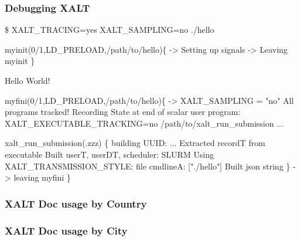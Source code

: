\documentclass{beamer}
\begin{document}
\begin{frame}[fragile]
    \frametitle{Debugging XALT}
 {\tiny
    \begin{semiverbatim}
\$ XALT\_TRACING=yes XALT\_SAMPLING=no ./hello

myinit(0/1,LD_PRELOAD,/path/to/hello)\{
    -> Setting up signals
    -> Leaving myinit
\}

Hello World!

myfini(0/1,LD_PRELOAD,/path/to/hello)\{
    -> XALT_SAMPLING = "no" All programs tracked!
  Recording State at end of scalar user program:
    XALT_EXECUTABLE_TRACKING=no /path/to/xalt_run_submission ...

  xalt_run_submission(.zzz) \{
    building UUID: ...
    Extracted recordT from executable
    Built userT, userDT, scheduler: SLURM
    Using XALT_TRANSMISSION_STYLE: file
    cmdlineA: ["./hello"]
    Built json string
  \}
    -> leaving myfini
\}
    \end{semiverbatim}
}
\end{frame}

\begin{frame}[fragile]
    \frametitle{XALT Doc usage by Country}
\end{frame}

\begin{frame}[fragile]
    \frametitle{XALT Doc usage by City}
\end{frame}
\end{document}
